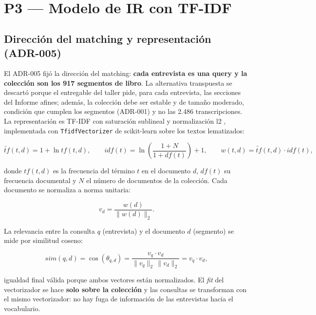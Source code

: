 \documentclass[11pt]{tg_usta}
\begin{document}
\section{P3 --- Modelo de IR con TF-IDF}\label{sec:p3}

\subsection{Dirección del matching y representación (ADR-005)}

El ADR-005 fijó la dirección del matching: \textbf{cada entrevista es una query y la colección son los 917 segmentos de libro}. La alternativa transpuesta se descartó porque el entregable del taller pide, para cada entrevista, las secciones del Informe afines; además, la colección debe ser estable y de tamaño moderado, condición que cumplen los segmentos (ADR-001) y no las 2.486 transcripciones. La representación es TF-IDF con saturación sublineal y normalización l2 \cite{salton1988term,manning2008introduction}, implementada con \texttt{TfidfVectorizer} de scikit-learn \cite{scikit2024tfidf} sobre los textos lematizados:

\begin{equation}\label{eq:tfidf}
\widetilde{tf}(t,d) = 1+\ln tf(t,d), \qquad
idf(t) = \ln\!\left(\frac{1+N}{1+df(t)}\right)+1, \qquad
w(t,d) = \widetilde{tf}(t,d)\cdot idf(t),
\end{equation}

\noindent donde $tf(t,d)$ es la frecuencia del término $t$ en el documento $d$, $df(t)$ su frecuencia documental y $N$ el número de documentos de la colección. Cada documento se normaliza a norma unitaria:

\begin{equation}\label{eq:vector}
v_d = \frac{w(d)}{\lVert w(d)\rVert_2}.
\end{equation}

\noindent La relevancia entre la consulta $q$ (entrevista) y el documento $d$ (segmento) se mide por similitud coseno:

\begin{equation}\label{eq:coseno}
sim(q,d) = \cos(\theta_{q,d}) = \frac{v_q\cdot v_d}{\lVert v_q\rVert_2\,\lVert v_d\rVert_2} = v_q\cdot v_d,
\end{equation}

\noindent igualdad final válida porque ambos vectores están normalizados. El \textit{fit} del vectorizador se hace \textbf{solo sobre la colección} y las consultas se transforman con el mismo vectorizador: no hay fuga de información de las entrevistas hacia el vocabulario.
\end{document}
